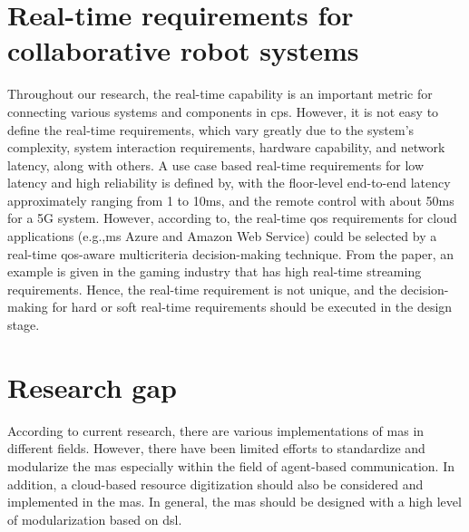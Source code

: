 \section{Real-time requirements for collaborative robot systems}
Throughout our research, the real-time capability is an important metric for connecting 
various systems and components in \gls{cps}. However, it is not easy to define the 
real-time requirements, which vary greatly due to the system's complexity, 
system interaction requirements, hardware capability, and network latency, 
along with others. 
A use case based real-time requirements for low latency and high reliability 
is defined by\cite{li_5g_2018}, with the floor-level end-to-end latency 
approximately ranging from 1 to 10ms, and the remote control with about 50ms for a 5G 
system. However, according to\cite{zhang_infrastructure_2017}, the real-time 
\gls{qos} requirements for cloud applications (e.g.,\gls{ms} Azure and Amazon Web Service) 
could be selected by a real-time \gls{qos}-aware multicriteria decision-making 
technique. From the paper, an example is given in the gaming industry that has 
high real-time streaming requirements. Hence, the real-time requirement is not unique, and the decision-making for hard or 
soft real-time requirements should be executed in the design stage. 

\section{Research gap}

According to current research, there are various implementations of \gls{mas} in 
different fields. However, there have been limited efforts to standardize and 
modularize the \gls{mas} especially within the field of agent-based communication. 
In addition, a cloud-based resource digitization should also 
be considered and implemented in the \gls{mas}. In general, the \gls{mas} should be designed 
with a high level of modularization based on \gls{dsl}.

